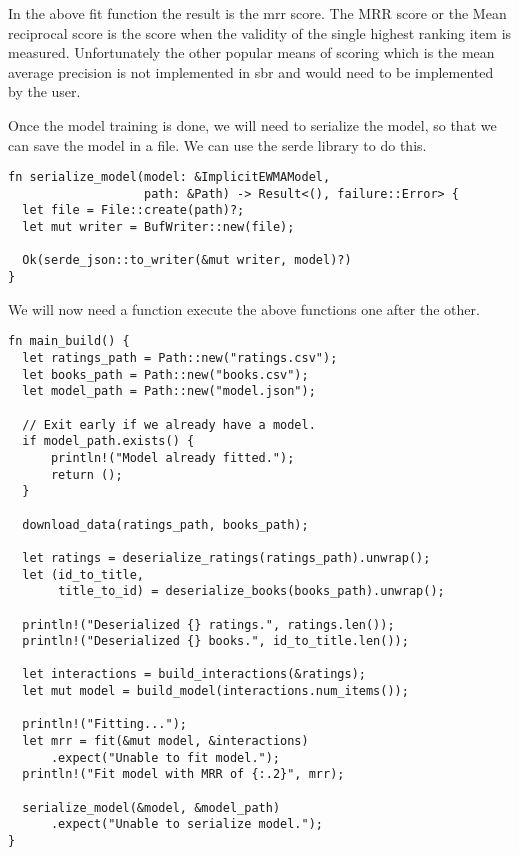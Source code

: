 \documentclass{book}
\begin{document}
In the above fit function the result is the mrr score. The MRR score or the Mean reciprocal score is the score when the validity of the single highest ranking item is measured. Unfortunately the other popular means of scoring which is the mean average precision is not implemented in sbr and would need to be implemented by the user.

Once the model training is done, we will need to serialize the model, so that we can save the model in a file. We can use the serde library to do this.

\begin{lstlisting}[caption={chapter7/goodbooks-recommender/src/main.rs}, basicstyle=\small]
fn serialize_model(model: &ImplicitEWMAModel,
                   path: &Path) -> Result<(), failure::Error> {
  let file = File::create(path)?;
  let mut writer = BufWriter::new(file);

  Ok(serde_json::to_writer(&mut writer, model)?)
}
\end{lstlisting}

We will now need a function execute the above functions one after the other.

\begin{lstlisting}[caption={chapter7/goodbooks-recommender/src/main.rs}, basicstyle=\small]
fn main_build() {
  let ratings_path = Path::new("ratings.csv");
  let books_path = Path::new("books.csv");
  let model_path = Path::new("model.json");

  // Exit early if we already have a model.
  if model_path.exists() {
      println!("Model already fitted.");
      return ();
  }

  download_data(ratings_path, books_path);

  let ratings = deserialize_ratings(ratings_path).unwrap();
  let (id_to_title,
       title_to_id) = deserialize_books(books_path).unwrap();

  println!("Deserialized {} ratings.", ratings.len());
  println!("Deserialized {} books.", id_to_title.len());

  let interactions = build_interactions(&ratings);
  let mut model = build_model(interactions.num_items());

  println!("Fitting...");
  let mrr = fit(&mut model, &interactions)
      .expect("Unable to fit model.");
  println!("Fit model with MRR of {:.2}", mrr);

  serialize_model(&model, &model_path)
      .expect("Unable to serialize model.");
}
\end{lstlisting}
\end{document}
